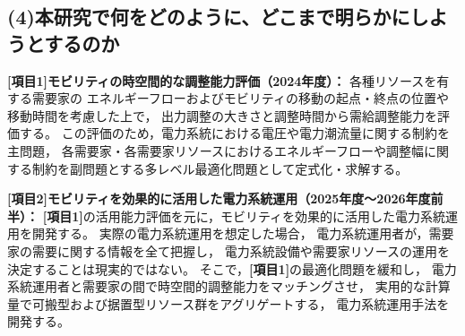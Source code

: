 \documentclass[11pt,a4paper,uplatex,dvipdfmx]{ujarticle} 		%
\newcommand{\研究課題名}{モビリティの時空間調整を活用した電力設備形成構築}
\newcommand{\研究機関名}{名古屋工業大学}
\newcommand{\研究代表者氏名}{中村勇太}
\newcommand{\研究期間の最終元号年度}{10}  %
\begin{document}
\vspace{-1\baselineskip}           %
\subsection*{(4)本研究で何をどのように、どこまで明らかにしようとするのか}
\vspace{-0.5\baselineskip}           %

\vspace{0.5\baselineskip}           %
\textbf{[項目1]モビリティの時空間的な調整能力評価（2024年度）：}
各種リソースを有する需要家の%
エネルギーフローおよびモビリティの移動の起点・終点の位置や移動時間を考慮した上で，
出力調整の大きさと調整時間から需給調整能力を評価する。%
この評価のため，電力系統における電圧や電力潮流量に関する制約を主問題，
各需要家・各需要家リソースにおけるエネルギーフローや調整幅に関する制約を副問題とする多レベル最適化問題として定式化・求解する。


\vspace{0.5\baselineskip}           %

\textbf{[項目2]モビリティを効果的に活用した電力系統運用（2025年度～2026年度前半）：} 
\textbf{[項目1]}の活用能力評価を元に，モビリティを効果的に活用した電力系統運用を開発する。
実際の電力系統運用を想定した場合，
電力系統運用者が，需要家の需要に関する情報を全て把握し，
電力系統設備や需要家リソースの運用を決定することは現実的ではない。
そこで，\textbf{[項目1]}の最適化問題を緩和し，
電力系統運用者と需要家の間で時空間的調整能力をマッチングさせ，
実用的な計算量で可搬型および据置型リソース群をアグリゲートする，
電力系統運用手法を開発する。
\end{document}

